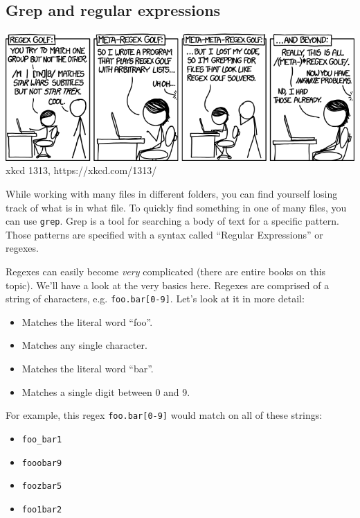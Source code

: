 \documentclass{TheAlternativeCourse}
\begin{document}
\subsection{Grep and regular expressions}

\includegraphics[width=\textwidth]{img/regex_golf.png}
{\footnotesize xkcd 1313, https://xkcd.com/1313/}

While working with many files in different folders, you can find yourself
losing track of what is in what file. To quickly find something in one of many
files, you can use \texttt{grep}. Grep is a tool for searching a body of text
for a specific pattern. Those patterns are specified with a syntax called
``Regular Expressions'' or regexes.

Regexes can easily become \emph{very} complicated (there are entire books on
this topic).  We'll have a look at the very basics here. Regexes are comprised
of a string of characters, e.g. \texttt{foo.bar[0-9]}. Let's look at it in more
detail:

\begin{itemize}
    \setlength\itemsep{-9pt}
    \item{ Matches the literal word ``foo''.}
    \item{ Matches any single character.}
    \item{ Matches the literal word ``bar''.}
    \item{\makebox[1.5cm]{\: \texttt{[0-9]\hfill}} Matches a single digit between 0 and 9.}
\end{itemize}

For example, this regex \texttt{foo.bar[0-9]} would match on all of these
strings:

\begin{itemize}
    \setlength\itemsep{-9pt}
    \item \texttt{foo\_bar1}
    \item \texttt{fooobar9}
    \item \texttt{foozbar5}
    \item \texttt{foo1bar2}
\end{itemize}
\end{document}
